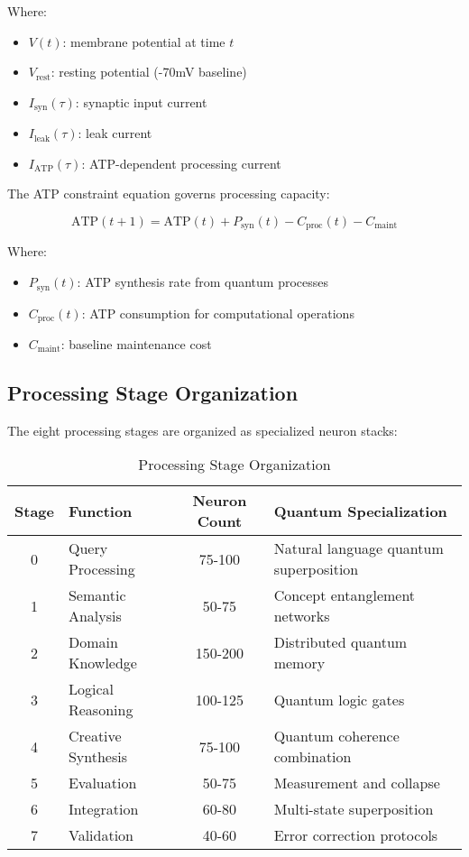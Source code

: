\documentclass[11pt,a4paper]{article}
\begin{document}
Where:
\begin{itemize}
\item $V(t)$: membrane potential at time $t$
\item $V_{\text{rest}}$: resting potential (-70mV baseline)
\item $I_{\text{syn}}(\tau)$: synaptic input current
\item $I_{\text{leak}}(\tau)$: leak current
\item $I_{\text{ATP}}(\tau)$: ATP-dependent processing current
\end{itemize}

The ATP constraint equation governs processing capacity:

\begin{equation}
\text{ATP}(t+1) = \text{ATP}(t) + P_{\text{syn}}(t) - C_{\text{proc}}(t) - C_{\text{maint}}
\end{equation}

Where:
\begin{itemize}
\item $P_{\text{syn}}(t)$: ATP synthesis rate from quantum processes
\item $C_{\text{proc}}(t)$: ATP consumption for computational operations
\item $C_{\text{maint}}$: baseline maintenance cost
\end{itemize}

\subsection{Processing Stage Organization}

The eight processing stages are organized as specialized neuron stacks:

\begin{table}[H]
\centering
\begin{tabular}{|c|l|c|l|}
\hline
\textbf{Stage} & \textbf{Function} & \textbf{Neuron Count} & \textbf{Quantum Specialization} \\
\hline
0 & Query Processing & 75-100 & Natural language quantum superposition \\
\hline
1 & Semantic Analysis & 50-75 & Concept entanglement networks \\
\hline
2 & Domain Knowledge & 150-200 & Distributed quantum memory \\
\hline
3 & Logical Reasoning & 100-125 & Quantum logic gates \\
\hline
4 & Creative Synthesis & 75-100 & Quantum coherence combination \\
\hline
5 & Evaluation & 50-75 & Measurement and collapse \\
\hline
6 & Integration & 60-80 & Multi-state superposition \\
\hline
7 & Validation & 40-60 & Error correction protocols \\
\hline
\end{tabular}
\caption{Processing Stage Organization}
\end{table}
\end{document}
